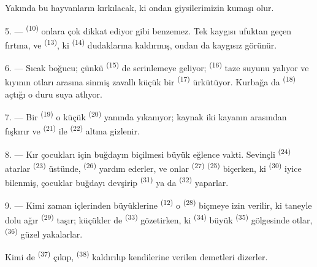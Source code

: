 Yakında bu hayvanların  kırkılacak, ki ondan giysilerimizin kumaşı
olur.

\VUsaut{5.0mm}
\VUsaut{3.4mm}

5. ---  \textsuperscript{(10)} onlara çok dikkat ediyor gibi
benzemez. Tek kaygısı ufuktan geçen fırtına, ve 
\textsuperscript{(13)}, ki  \textsuperscript{(14)}
dudaklarına kaldırmış, ondan da kaygısız görünür.

6. --- Sıcak boğucu; çünkü  \textsuperscript{(15)} de
serinlemeye geliyor;  \textsuperscript{(16)} taze suyunu
yalıyor ve kıyının otları arasına sinmiş zavallı küçük bir 
\textsuperscript{(17)} ürkütüyor. Kurbağa da 
\textsuperscript{(18)} açtığı o duru suya atlıyor.

7. --- Bir  \textsuperscript{(19)} o küçük
 \textsuperscript{(20)} yanında yıkanıyor; kaynak iki kayanın
arasından fışkırır ve  \textsuperscript{(21)} ile
 \textsuperscript{(22)} altına gizlenir.

\VUsaut{5.0mm}
\VUsaut{3.4mm}

8. --- Kır çocukları için buğdayın biçilmesi büyük eğlence vakti.
Sevinçli  \textsuperscript{(24)} atarlar
 \textsuperscript{(23)} üstünde,
 \textsuperscript{(26)} yardım ederler, ve onlar
 \textsuperscript{(27)} 
\textsuperscript{(25)} biçerken, ki 
\textsuperscript{(30)} iyice bilenmiş, çocuklar buğdayı devşirip  \textsuperscript{(31)} ya
da  \textsuperscript{(32)} yaparlar.

9. --- Kimi zaman içlerinden büyüklerine 
\textsuperscript{(12)} o  \textsuperscript{(28)} biçmeye
izin verilir, ki taneyle dolu ağır  \textsuperscript{(29)}
taşır; küçükler de  \textsuperscript{(33)} gözetirken, ki
 \textsuperscript{(34)} büyük 
\textsuperscript{(35)} gölgesinde otlar, 
\textsuperscript{(36)} güzel  yakalarlar.

Kimi de  \textsuperscript{(37)} çıkıp, 
\textsuperscript{(38)} kaldırılıp kendilerine verilen demetleri dizerler.

